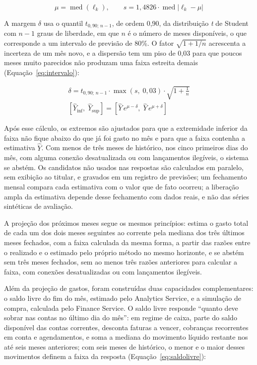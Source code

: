 \begin{equation}
\mu = \operatorname{med}\left(\ell_k\right),
\qquad
s = 1{,}4826 \cdot \operatorname{med}\left| \ell_k - \mu \right|
\label{eq:dispersao}
\end{equation}

A margem $\delta$ usa o quantil $t_{0{,}90;\, n-1}$, de ordem 0,90, da distribuição \textit{t} de Student com $n - 1$ graus de liberdade, em que $n$ é o número de meses disponíveis, o que corresponde a um intervalo de previsão de 80\%. O fator $\sqrt{1 + 1/n}$ acrescenta a incerteza de um mês novo, e a dispersão tem um piso de 0,03 para que poucos meses muito parecidos não produzam uma faixa estreita demais (Equação~\ref{eq:intervalo}):

\begin{equation}
\begin{gathered}
\delta = t_{0{,}90;\, n-1} \cdot \max\left(s,\; 0{,}03\right) \cdot \sqrt{1 + \frac{1}{n}} \\
\left[\hat{Y}_{\mathrm{inf}},\; \hat{Y}_{\mathrm{sup}}\right] = \left[\hat{Y}\, e^{\mu - \delta},\; \hat{Y}\, e^{\mu + \delta}\right]
\end{gathered}
\label{eq:intervalo}
\end{equation}

Após esse cálculo, os extremos são ajustados para que a extremidade inferior da faixa não fique abaixo do que já foi gasto no mês e para que a faixa contenha a estimativa $\hat{Y}$. Com menos de três meses de histórico, nos cinco primeiros dias do mês, com alguma conexão desatualizada ou com lançamentos ilegíveis, o sistema se abstém. Os candidatos não usados nas respostas são calculados em paralelo, sem exibição ao titular, e gravados em um registro de previsões; um fechamento mensal compara cada estimativa com o valor que de fato ocorreu; a liberação ampla da estimativa depende desse fechamento com dados reais, e não das séries sintéticas de avaliação.

A projeção dos próximos meses segue os mesmos princípios: estima o gasto total de cada um dos dois meses seguintes ao corrente pela mediana dos três últimos meses fechados, com a faixa calculada da mesma forma, a partir das razões entre o realizado e o estimado pelo próprio método no mesmo horizonte, e se abstém sem três meses fechados, sem ao menos três razões anteriores para calcular a faixa, com conexões desatualizadas ou com lançamentos ilegíveis.

Além da projeção de gastos, foram construídas duas capacidades complementares: o saldo livre do fim do mês, estimado pelo Analytics Service, e a simulação de compra, calculada pelo Finance Service. O saldo livre responde ``quanto deve sobrar nas contas no último dia do mês'': em regime de caixa, parte do saldo disponível das contas correntes, desconta faturas a vencer, cobranças recorrentes em conta e agendamentos, e soma a mediana do movimento líquido restante nos até seis meses anteriores; com seis meses de histórico, o menor e o maior desses movimentos definem a faixa da resposta (Equação~\ref{eq:saldolivre}):

